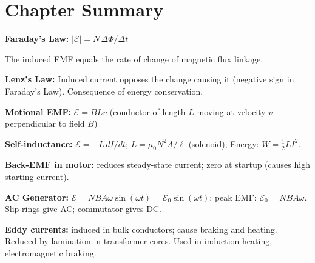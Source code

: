 \begin{diagbox}
\begin{center}
\end{center}
\end{diagbox}

\section{Chapter Summary}

\begin{summarybox}
\textbf{Faraday's Law:}
$|\mathcal{E}| = N\,\Delta\Phi/\Delta t$

The induced EMF equals the rate of change of
magnetic flux linkage.

\textbf{Lenz's Law:} Induced current opposes the
change causing it (negative sign in Faraday's Law).
Consequence of energy conservation.

\textbf{Motional EMF:} $\mathcal{E} = BLv$
(conductor of length $L$ moving at velocity $v$
perpendicular to field $B$)

\textbf{Self-inductance:} $\mathcal{E} = -L\,dI/dt$;
$L = \mu_0 N^2 A/\ell$ (solenoid);
Energy: $W = \frac{1}{2}LI^2$.

\textbf{Back-EMF in motor:}
reduces steady-state current; zero at startup
(causes high starting current).

\textbf{AC Generator:}
$\mathcal{E} = NBA\omega\sin(\omega t)
= \mathcal{E}_0\sin(\omega t)$;
peak EMF: $\mathcal{E}_0 = NBA\omega$.
Slip rings give AC; commutator gives DC.

\textbf{Eddy currents:} induced in bulk conductors;
cause braking and heating.
Reduced by lamination in transformer cores.
Used in induction heating, electromagnetic braking.
\end{summarybox}


